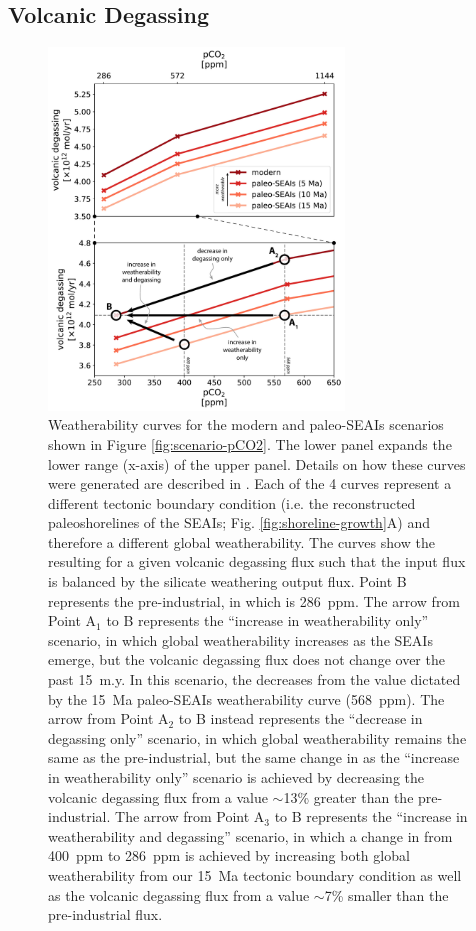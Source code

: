 \subsection{Volcanic Degassing}

\begin{figure}[!htbp]
\begin{center}
	\includegraphics[width=0.7\textwidth]{figures/SEAIs/weatherability-curves.pdf}
	\caption[Weatherability curves simulated by GEOCLIM.]{Weatherability curves for the modern and paleo-SEAIs scenarios shown in Figure \ref{fig:scenario-pCO2}. The lower panel expands the lower \pCOtwo range (x-axis) of the upper panel. Details on how these curves were generated are described in \MM. Each of the 4 curves represent a different tectonic boundary condition (i.e. the reconstructed paleoshorelines of the SEAIs; Fig. \ref{fig:shoreline-growth}A) and therefore a different global weatherability. The curves show the resulting \pCOtwo for a given volcanic degassing flux such that the input flux is balanced by the silicate weathering output flux. Point B represents the pre-industrial, in which \pCOtwo is 286~ppm. The arrow from Point A$_{1}$ to B represents the ``increase in weatherability only'' scenario, in which global weatherability increases as the SEAIs emerge, but the volcanic degassing flux does not change over the past 15~m.y. In this scenario, the \pCOtwo decreases from the value dictated by the 15~Ma paleo-SEAIs weatherability curve (568~ppm). The arrow from Point A$_{2}$ to B instead represents the ``decrease in degassing only'' scenario, in which global weatherability remains the same as the pre-industrial, but the same change in \pCOtwo as the ``increase in weatherability only'' scenario is achieved by decreasing the volcanic degassing flux from a value $\sim$13\% greater than the pre-industrial. The arrow from Point A$_{3}$ to B represents the ``increase in weatherability and degassing'' scenario, in which a change in \pCOtwo from 400~ppm to 286~ppm is achieved by increasing both global weatherability from our 15~Ma tectonic boundary condition as well as the volcanic degassing flux from a value $\sim$7\% smaller than the pre-industrial flux.}

\end{center}
\end{figure}
